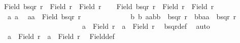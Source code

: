 \begin{isabellebody}
{\isachardoublequoteopen}Field\ {\isacharparenleft}{\kern0pt}bsqr\ r{\isacharparenright}{\kern0pt}\ {\isacharequal}{\kern0pt}\ Field\ r\ {\isasymtimes}\ Field\ r{\isachardoublequoteclose}\isanewline
%
\isadelimproof
%
\endisadelimproof
%
\isatagproof
{}\isamarkupfalse%
\isanewline
\ \ \isamarkupfalse%
\ {\isachardoublequoteopen}Field\ {\isacharparenleft}{\kern0pt}bsqr\ r{\isacharparenright}{\kern0pt}\ {\isasymle}\ Field\ r\ {\isasymtimes}\ Field\ r{\isachardoublequoteclose}\isanewline
\ \ \isamarkupfalse%
{\isacharminus}{\kern0pt}\isanewline
\ \ \ \ \isacommand{{\isacharbraceleft}{\kern0pt}}\isamarkupfalse%
\isamarkupfalse%
\ a{}\ a{}\ \isamarkupfalse%
\ {\isachardoublequoteopen}{\isacharparenleft}{\kern0pt}a{}{\isacharcomma}{\kern0pt}a{}{\isacharparenright}{\kern0pt}\ {\isasymin}\ Field\ {\isacharparenleft}{\kern0pt}bsqr\ r{\isacharparenright}{\kern0pt}{\isachardoublequoteclose}\isanewline
\ \ \ \ \ \isamarkupfalse%
\isanewline
\ \ \ \ \ \isamarkupfalse%
\ {\isachardoublequoteopen}{\isasymAnd}\ b{}\ b{}{\isachardot}{\kern0pt}\ {\isacharparenleft}{\kern0pt}{\isacharparenleft}{\kern0pt}a{}{\isacharcomma}{\kern0pt}a{}{\isacharparenright}{\kern0pt}{\isacharcomma}{\kern0pt}{\isacharparenleft}{\kern0pt}b{}{\isacharcomma}{\kern0pt}b{}{\isacharparenright}{\kern0pt}{\isacharparenright}{\kern0pt}\ {\isasymin}\ bsqr\ r\ {\isasymor}\ {\isacharparenleft}{\kern0pt}{\isacharparenleft}{\kern0pt}b{}{\isacharcomma}{\kern0pt}b{}{\isacharparenright}{\kern0pt}{\isacharcomma}{\kern0pt}{\isacharparenleft}{\kern0pt}a{}{\isacharcomma}{\kern0pt}a{}{\isacharparenright}{\kern0pt}{\isacharparenright}{\kern0pt}\ {\isasymin}\ bsqr\ r\ {\isasymLongrightarrow}\isanewline
\ \ \ \ \ \ \ \ \ \ \ \ \ \ \ \ \ \ \ \ \ \ a{}\ {\isasymin}\ Field\ r\ {\isasymand}\ a{}\ {\isasymin}\ Field\ r{\isachardoublequoteclose}\ \isamarkupfalse%
\ bsqr{\isacharunderscore}{\kern0pt}def\ \isamarkupfalse%
\ auto\isanewline
\ \ \ \ \ \isamarkupfalse%
\ \isamarkupfalse%
\ {\isachardoublequoteopen}a{}\ {\isasymin}\ Field\ r\ {\isasymand}\ a{}\ {\isasymin}\ Field\ r{\isachardoublequoteclose}\ \isamarkupfalse%
\ Field{\isacharunderscore}{\kern0pt}def\ \isamarkupfalse%

\end{isabellebody}
